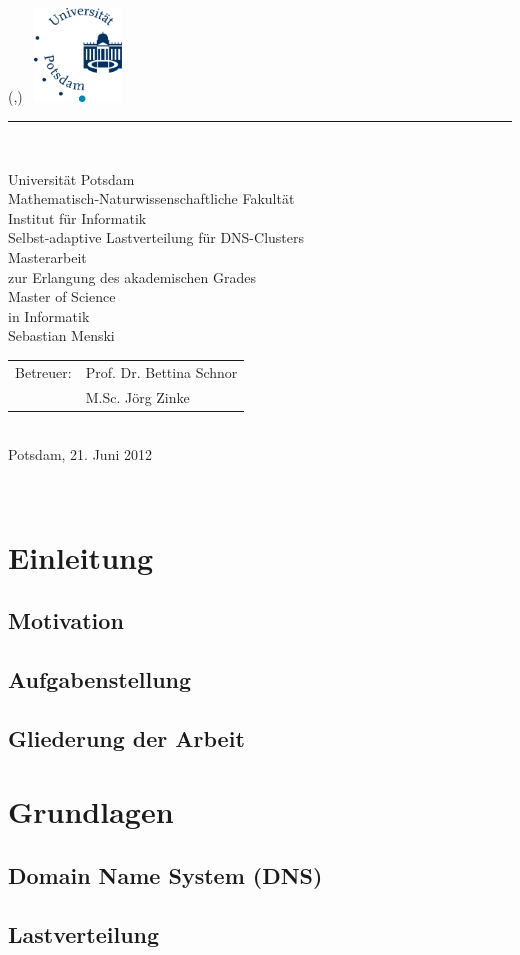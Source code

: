\documentclass[a4paper, 11pt, toc=bibliography, toc=listof]{scrbook}
\newlength{\TitleMargin}
\newlength{\TitleWidth}
\newcommand{\TitleUni}{Universität Potsdam}
\newcommand{\TitleInstitut}{Mathematisch-Naturwissenschaftliche Fakultät\\Institut für Informatik}
\newcommand{\TitleTitel}{Selbst-adaptive Lastverteilung für DNS-Clusters}
\newcommand{\TitleTyp}{Masterarbeit}
\newcommand{\TitleAutor}{Sebastian Menski}
\newcommand{\TitleBetreuerText}{Betreuer}
\newcommand{\TitleBetreuer}{Prof. Dr. Bettina Schnor\\ &M.Sc. Jörg Zinke}
\newcommand{\TitleAbschlussText}{zur Erlangung des akademischen Grades\\Master of Science\\in Informatik}
\newcommand{\TitleOrt}{Potsdam}
\newcommand{\TitleDatum}{21. Juni 2012}
\renewcommand{\maketitle}{
	\thispagestyle{empty}
	\begin{textblock*}{\TitleWidth}(\TitleMargin,\TitleMargin)
		~\hfill\includegraphics[height=2.5cm]{images/uni-logo}\\[3mm]
		{\color{uniblue}\rule{\TitleWidth}{1mm}}\\[5mm]
		{
			\centering
			\sffamily\Large
			{\LARGE\TitleUni}\\[0.5\baselineskip]
			{\large\TitleInstitut}\\[5\baselineskip]
			{\Huge\TitleTitel}\\[3\baselineskip]

			{\TitleTyp}\\
			\TitleAbschlussText\\[3\baselineskip]

			\TitleAutor\\[6\baselineskip]
			\begin{tabular}{rl}
				\TitleBetreuerText: & \TitleBetreuer
			\end{tabular}\\[3\baselineskip]
			\TitleOrt, \TitleDatum\par
		}
	\end{textblock*}
	~\clearpage
}
\begin{document}
	\frontmatter
	\maketitle{}
	\tableofcontents{}

	\onehalfspacing{}
	\mainmatter
	\pagestyle{scrheadings}

	\chapter{Einleitung} %
	\label{cha:Einleitung}

		\section{Motivation} %
		\label{sec:Motivation}
			

		\section{Aufgabenstellung} %
		\label{sec:Aufgabenstellung}
			

		\section{Gliederung der Arbeit} %
		\label{sec:Gliederung der Arbeit}
			


	\chapter{Grundlagen} %
	\label{cha:Grundlagen}

		\section{Domain Name System (DNS)} %
		\label{sec:Domain Name System (DNS)}
			

		\section{Lastverteilung} %
		\label{sec:Lastverteilung}
			
\end{document}
